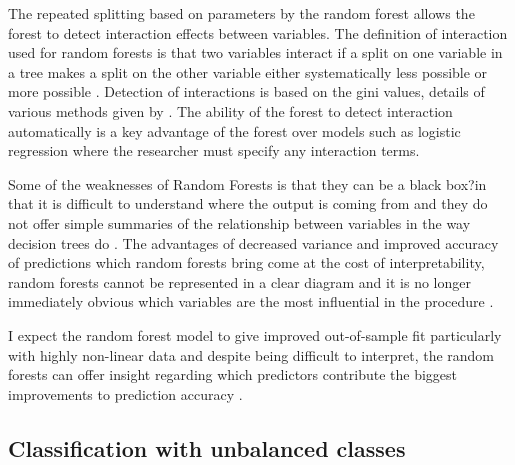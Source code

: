 \documentclass[11pt,a4paper]{article}
\begin{document}
The repeated splitting based on parameters by the random forest allows the forest to detect interaction effects between variables. The definition of interaction used for random forests is that two variables interact if a split on one variable in a tree makes a split on the other variable either systematically less possible or more possible \citep{breiman01}. Detection of interactions is based on the gini values,  details of various methods given by \citet{kelly12}. The ability of the forest to detect interaction automatically is a key advantage of the forest over models such as logistic regression where the researcher must specify any interaction terms. 

Some of the weaknesses of Random Forests is that they can be a black box?in that it is difficult to understand where the output is coming from and they do not offer simple summaries of the relationship between variables in the way decision trees do \citep{varian14}. The advantages of decreased variance and improved accuracy of predictions which random forests bring come at the cost of interpretability, random forests cannot be represented in a clear diagram and it is no longer immediately obvious which variables are the most influential in the procedure \citep{james13}. 

I expect the random forest model to give improved out-of-sample fit particularly with highly non-linear data and despite being difficult to interpret, the random forests can offer insight regarding which predictors contribute the biggest improvements to prediction accuracy \citep{varian14}.


\subsection{Classification with unbalanced classes}
\end{document}

